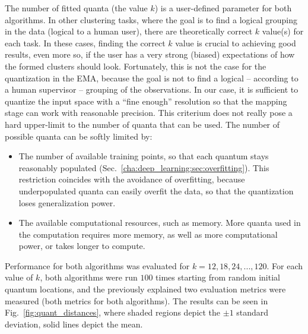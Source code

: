 			The number of fitted quanta (the value $k$) is a user-defined parameter for both algorithms.
			In other clustering tasks, where the goal is to find a logical grouping in the data (logical to a human user), there are theoretically correct $k$ value(s) for each task.
			In these cases, finding the correct $k$ value is crucial to achieving good results, even more so, if the user has a very strong (biased) expectations of how the formed clusters should look.
			Fortunately, this is not the case for the quantization in the \ac{EMA}, because the goal is not to find a logical -- according to a human supervisor -- grouping of the observations.
			In our case, it is sufficient to quantize the input space with a ``fine enough'' resolution so that the mapping stage can work with reasonable precision.
			This criterium does not really pose a hard upper-limit to the number of quanta that can be used.
			The number of possible quanta can be softly limited by:			
			\begin{itemize}
				\item The number of available training points, so that each quantum stays reasonably populated (Sec.~\ref{cha:deep_learning:sec:overfitting}).
				This restriction coincides with the avoidance of overfitting, because underpopulated quanta can easily overfit the data, so that the quantization loses generalization power.
				
				\item The available computational resources, such as memory.
				More quanta used in the computation requires more memory, as well as more computational power, or takes longer to compute.
			\end{itemize} 
			
			Performance for both algorithms was evaluated for $k = 12, 18, 24, ..., 120$.
			For each value of $k$, both algorithms were run $100$ times starting from random initial quantum locations, and the previously explained two evaluation metrics were measured (both metrics for both algorithms).
			The results can be seen in Fig.~\ref{fig:quant_distances}, where shaded regions depict the $\pm1$ standard deviation, solid lines depict the mean.
			
